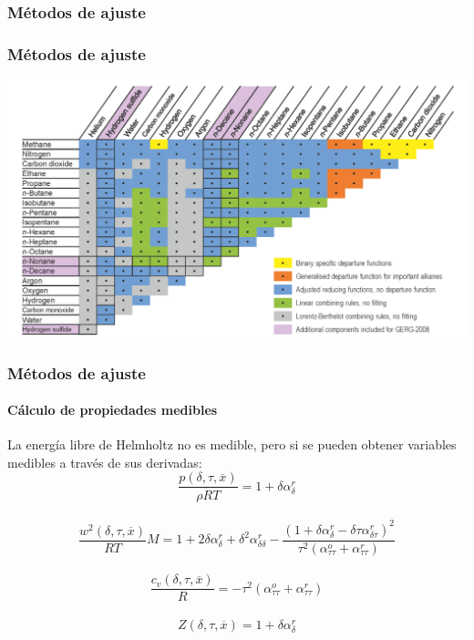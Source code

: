 \documentclass[aspectratio=1610,multi,rgb]{beamer}
\begin{document}
\subsubsection{Métodos de ajuste}
\begin{frame}[t]
	\frametitle{Métodos de ajuste}
	\includegraphics[width=\textwidth]{figs/compuestos.png}
\end{frame}
\begin{frame}
	\frametitle{Métodos de ajuste}
	\framesubtitle{Cálculo de propiedades medibles}
	La energía libre de Helmholtz no es medible, pero si se pueden obtener
	variables medibles a través de sus derivadas:
	\begin{equation}
		\frac{p(\delta,\tau,\overline{x})}{\rho RT} = 1 + \delta \alpha^r_{\delta}
	\end{equation} \\
	\begin{equation}
		\frac{w^2(\delta,\tau,\overline{x})}{RT}M = 
		1 + 2\delta \alpha_{\delta}^r + \delta^2\alpha_{\delta\delta}^r
		- \frac{(1+\delta \alpha^r_{\delta}- \delta \tau
		\alpha^r_{\delta\tau})^2}{\tau^2(\alpha_{\tau \tau}^o +
	\alpha^r_{\tau \tau})}
	\end{equation} \\
	\begin{equation}
		\frac{c_v(\delta,\tau,\overline{x})}{R} =
		-\tau^2(\alpha_{\tau\tau}^o + \alpha_{\tau\tau}^r)
	\end{equation} \\ 
	\begin{equation}
		Z(\delta, \tau, \overline{x}) = 1 + \delta\alpha^r_\delta
	\end{equation} \\
\end{frame}
\end{document}

